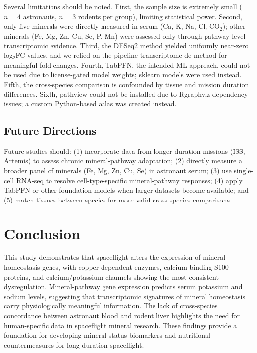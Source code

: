 \documentclass[11pt,a4paper]{article}
\begin{document}
Several limitations should be noted. First, the sample size is extremely small ($n=4$ astronauts, $n=3$ rodents per group), limiting statistical power. Second, only five minerals were directly measured in serum (Ca, K, Na, Cl, CO$_2$); other minerals (Fe, Mg, Zn, Cu, Se, P, Mn) were assessed only through pathway-level transcriptomic evidence. Third, the DESeq2 method yielded uniformly near-zero log$_2$FC values, and we relied on the pipeline-transcriptome-de method for meaningful fold changes. Fourth, TabPFN, the intended ML approach, could not be used due to license-gated model weights; sklearn models were used instead. Fifth, the cross-species comparison is confounded by tissue and mission duration differences. Sixth, pathview could not be installed due to Rgraphviz dependency issues; a custom Python-based atlas was created instead.

\subsection{Future Directions}

Future studies should: (1) incorporate data from longer-duration missions (ISS, Artemis) to assess chronic mineral-pathway adaptation; (2) directly measure a broader panel of minerals (Fe, Mg, Zn, Cu, Se) in astronaut serum; (3) use single-cell RNA-seq to resolve cell-type-specific mineral-pathway responses; (4) apply TabPFN or other foundation models when larger datasets become available; and (5) match tissues between species for more valid cross-species comparisons.

\section{Conclusion}

This study demonstrates that spaceflight alters the expression of mineral homeostasis genes, with copper-dependent enzymes, calcium-binding S100 proteins, and calcium/potassium channels showing the most consistent dysregulation. Mineral-pathway gene expression predicts serum potassium and sodium levels, suggesting that transcriptomic signatures of mineral homeostasis carry physiologically meaningful information. The lack of cross-species concordance between astronaut blood and rodent liver highlights the need for human-specific data in spaceflight mineral research. These findings provide a foundation for developing mineral-status biomarkers and nutritional countermeasures for long-duration spaceflight.
\end{document}
